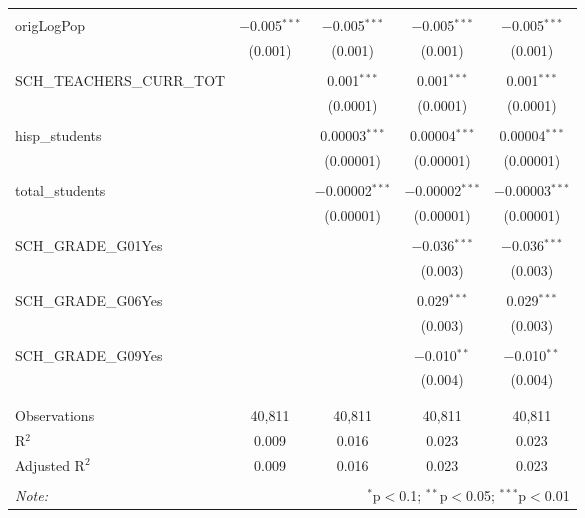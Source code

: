 \begin{table}[!htbp]
\begin{tabular}{@{\extracolsep{-2pt}}lcccc}
  & & & & \\ 
 origLogPop & $-$0.005$^{***}$ & $-$0.005$^{***}$ & $-$0.005$^{***}$ & $-$0.005$^{***}$ \\ 
  & (0.001) & (0.001) & (0.001) & (0.001) \\ 
  & & & & \\ 
 SCH\_TEACHERS\_CURR\_TOT &  & 0.001$^{***}$ & 0.001$^{***}$ & 0.001$^{***}$ \\ 
  &  & (0.0001) & (0.0001) & (0.0001) \\ 
  & & & & \\ 
 hisp\_students &  & 0.00003$^{***}$ & 0.00004$^{***}$ & 0.00004$^{***}$ \\ 
  &  & (0.00001) & (0.00001) & (0.00001) \\ 
  & & & & \\ 
 total\_students &  & $-$0.00002$^{***}$ & $-$0.00002$^{***}$ & $-$0.00003$^{***}$ \\ 
  &  & (0.00001) & (0.00001) & (0.00001) \\ 
  & & & & \\ 
 SCH\_GRADE\_G01Yes &  &  & $-$0.036$^{***}$ & $-$0.036$^{***}$ \\ 
  &  &  & (0.003) & (0.003) \\ 
  & & & & \\ 
 SCH\_GRADE\_G06Yes &  &  & 0.029$^{***}$ & 0.029$^{***}$ \\ 
  &  &  & (0.003) & (0.003) \\ 
  & & & & \\ 
 SCH\_GRADE\_G09Yes &  &  & $-$0.010$^{**}$ & $-$0.010$^{**}$ \\ 
  &  &  & (0.004) & (0.004) \\ 
  & & & & \\ 
\hline \\[-1.8ex] 
Observations & 40,811 & 40,811 & 40,811 & 40,811 \\ 
R$^{2}$ & 0.009 & 0.016 & 0.023 & 0.023 \\ 
Adjusted R$^{2}$ & 0.009 & 0.016 & 0.023 & 0.023 \\ 
\hline 
\hline \\[-1.8ex] 
\textit{Note:}  & \multicolumn{4}{r}{$^{*}$p$<$0.1; $^{**}$p$<$0.05; $^{***}$p$<$0.01} \\ 
\end{tabular} 
\end{table} 
